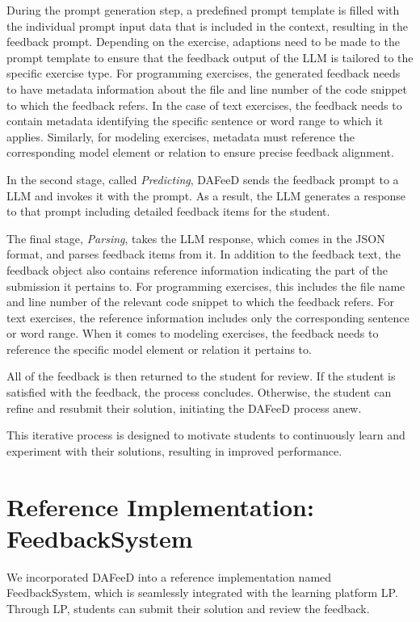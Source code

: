 \documentclass[sigconf,screen,review,anonymous]{acmart}
\begin{document}
During the prompt generation step, a predefined prompt template is filled with the individual prompt input data that is included in the context, resulting in the feedback prompt.
Depending on the exercise, adaptions need to be made to the prompt template to ensure that the feedback output of the LLM is tailored to the specific exercise type.
For programming exercises, the generated feedback needs to have metadata information about the file and line number of the code snippet to which the feedback refers.
In the case of text exercises, the feedback needs to contain metadata identifying the specific sentence or word range to which it applies.
Similarly, for modeling exercises, metadata must reference the corresponding model element or relation to ensure precise feedback alignment.

In the second stage, called \textit{Predicting}, DAFeeD sends the feedback prompt to a LLM and invokes it with the prompt. 
As a result, the LLM generates a response to that prompt including detailed feedback items for the student.

The final stage, \textit{Parsing}, takes the LLM response, which comes in the JSON format, and parses feedback items from it. 
In addition to the feedback text, the feedback object also contains reference information indicating the part of the submission it pertains to.
For programming exercises, this includes the file name and line number of the relevant code snippet to which the feedback refers.
For text exercises, the reference information includes only the corresponding sentence or word range.
When it comes to modeling exercises, the feedback needs to reference the specific model element or relation it pertains to.

All of the feedback is then returned to the student for review.
If the student is satisfied with the feedback, the process concludes. 
Otherwise, the student can refine and resubmit their solution, initiating the DAFeeD process anew.

This iterative process is designed to motivate students to continuously learn and experiment with their solutions, resulting in improved performance.

\section{Reference Implementation: FeedbackSystem} %
\label{sec:reference-implementation}

We incorporated DAFeeD into a reference implementation named FeedbackSystem, which is seamlessly integrated with the learning platform LP. 
Through LP, students can submit their solution and review the feedback.
\end{document}

